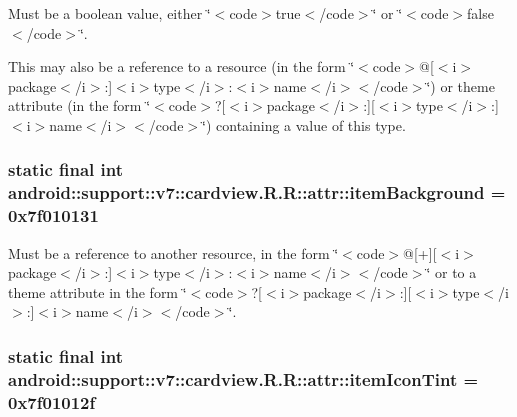 Must be a boolean value, either \char`\"{}$<$code$>$true$<$/code$>$\char`\"{} or \char`\"{}$<$code$>$false$<$/code$>$\char`\"{}. 

This may also be a reference to a resource (in the form \char`\"{}$<$code$>$@\mbox{[}$<$i$>$package$<$/i$>$:\mbox{]}$<$i$>$type$<$/i$>$:$<$i$>$name$<$/i$>$$<$/code$>$\char`\"{}) or theme attribute (in the form \char`\"{}$<$code$>$?\mbox{[}$<$i$>$package$<$/i$>$:\mbox{]}\mbox{[}$<$i$>$type$<$/i$>$:\mbox{]}$<$i$>$name$<$/i$>$$<$/code$>$\char`\"{}) containing a value of this type. \hypertarget{classandroid_1_1support_1_1v7_1_1cardview_1_1_r_1_1attr_697033ac5d7d3366d58de9382097c05d}{
\subsubsection[{itemBackground}]{\setlength{\rightskip}{0pt plus 5cm}static final int android::support::v7::cardview.R.R::attr::itemBackground = 0x7f010131}}
\label{classandroid_1_1support_1_1v7_1_1cardview_1_1_r_1_1attr_697033ac5d7d3366d58de9382097c05d}


Must be a reference to another resource, in the form \char`\"{}$<$code$>$@\mbox{[}+\mbox{]}\mbox{[}$<$i$>$package$<$/i$>$:\mbox{]}$<$i$>$type$<$/i$>$:$<$i$>$name$<$/i$>$$<$/code$>$\char`\"{} or to a theme attribute in the form \char`\"{}$<$code$>$?\mbox{[}$<$i$>$package$<$/i$>$:\mbox{]}\mbox{[}$<$i$>$type$<$/i$>$:\mbox{]}$<$i$>$name$<$/i$>$$<$/code$>$\char`\"{}. \hypertarget{classandroid_1_1support_1_1v7_1_1cardview_1_1_r_1_1attr_e2939f7481d5f41ad2ef121e6dc2c1f9}{
\subsubsection[{itemIconTint}]{\setlength{\rightskip}{0pt plus 5cm}static final int android::support::v7::cardview.R.R::attr::itemIconTint = 0x7f01012f}}
\label{classandroid_1_1support_1_1v7_1_1cardview_1_1_r_1_1attr_e2939f7481d5f41ad2ef121e6dc2c1f9}


